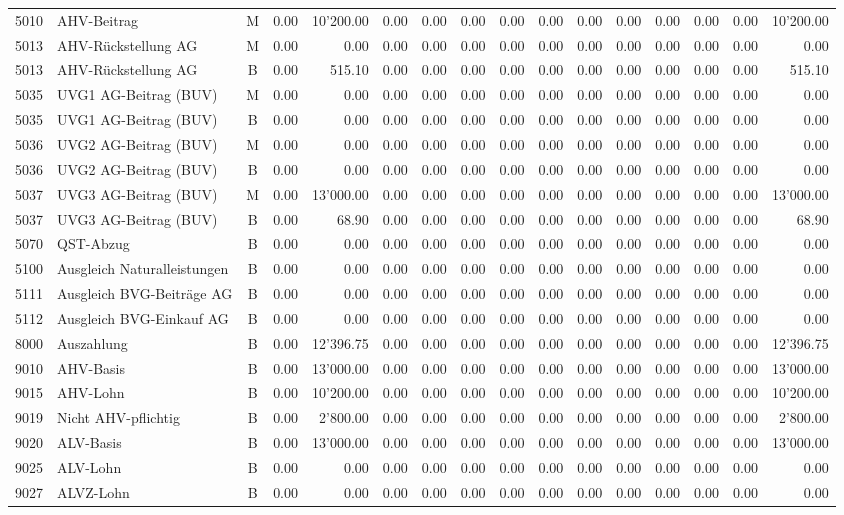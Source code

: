 \documentclass[8pt,a4paper]{extarticle}
\begin{document}
\begin{longtable}{@{\extracolsep{\fill}} l l c r r r r r r r r r r r r r}
5010&AHV-Beitrag&M&0.00&10'200.00&0.00&0.00&0.00&0.00&0.00&0.00&0.00&0.00&0.00&0.00&10'200.00\\
5013&AHV-Rückstellung AG&M&0.00&0.00&0.00&0.00&0.00&0.00&0.00&0.00&0.00&0.00&0.00&0.00&0.00\\
5013&AHV-Rückstellung AG&B&0.00&515.10&0.00&0.00&0.00&0.00&0.00&0.00&0.00&0.00&0.00&0.00&515.10\\
5035&UVG1 AG-Beitrag (BUV)&M&0.00&0.00&0.00&0.00&0.00&0.00&0.00&0.00&0.00&0.00&0.00&0.00&0.00\\
5035&UVG1 AG-Beitrag (BUV)&B&0.00&0.00&0.00&0.00&0.00&0.00&0.00&0.00&0.00&0.00&0.00&0.00&0.00\\
5036&UVG2 AG-Beitrag (BUV)&M&0.00&0.00&0.00&0.00&0.00&0.00&0.00&0.00&0.00&0.00&0.00&0.00&0.00\\
5036&UVG2 AG-Beitrag (BUV)&B&0.00&0.00&0.00&0.00&0.00&0.00&0.00&0.00&0.00&0.00&0.00&0.00&0.00\\
5037&UVG3 AG-Beitrag (BUV)&M&0.00&13'000.00&0.00&0.00&0.00&0.00&0.00&0.00&0.00&0.00&0.00&0.00&13'000.00\\
5037&UVG3 AG-Beitrag (BUV)&B&0.00&68.90&0.00&0.00&0.00&0.00&0.00&0.00&0.00&0.00&0.00&0.00&68.90\\
5070&QST-Abzug&B&0.00&0.00&0.00&0.00&0.00&0.00&0.00&0.00&0.00&0.00&0.00&0.00&0.00\\
5100&Ausgleich Naturalleistungen&B&0.00&0.00&0.00&0.00&0.00&0.00&0.00&0.00&0.00&0.00&0.00&0.00&0.00\\
5111&Ausgleich BVG-Beiträge AG&B&0.00&0.00&0.00&0.00&0.00&0.00&0.00&0.00&0.00&0.00&0.00&0.00&0.00\\
5112&Ausgleich BVG-Einkauf AG&B&0.00&0.00&0.00&0.00&0.00&0.00&0.00&0.00&0.00&0.00&0.00&0.00&0.00\\
8000&Auszahlung&B&0.00&12'396.75&0.00&0.00&0.00&0.00&0.00&0.00&0.00&0.00&0.00&0.00&12'396.75\\
9010&AHV-Basis&B&0.00&13'000.00&0.00&0.00&0.00&0.00&0.00&0.00&0.00&0.00&0.00&0.00&13'000.00\\
9015&AHV-Lohn&B&0.00&10'200.00&0.00&0.00&0.00&0.00&0.00&0.00&0.00&0.00&0.00&0.00&10'200.00\\
9019&Nicht AHV-pflichtig&B&0.00&2'800.00&0.00&0.00&0.00&0.00&0.00&0.00&0.00&0.00&0.00&0.00&2'800.00\\
9020&ALV-Basis&B&0.00&13'000.00&0.00&0.00&0.00&0.00&0.00&0.00&0.00&0.00&0.00&0.00&13'000.00\\
9025&ALV-Lohn&B&0.00&0.00&0.00&0.00&0.00&0.00&0.00&0.00&0.00&0.00&0.00&0.00&0.00\\
9027&ALVZ-Lohn&B&0.00&0.00&0.00&0.00&0.00&0.00&0.00&0.00&0.00&0.00&0.00&0.00&0.00\\

\end{longtable}
\end{document}
